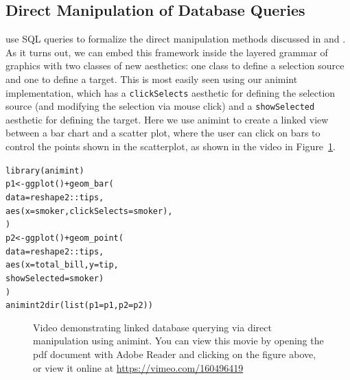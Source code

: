 \documentclass[journal]{vgtc}\usepackage[]{graphicx}\usepackage[]{color}
\makeatletter
\newcommand{\hlopt}[1]{\textcolor[rgb]{0,0,0}{#1}}%
\newcommand{\hlstd}[1]{\textcolor[rgb]{0,0,0}{#1}}%
\newcommand{\hlkwb}[1]{\textcolor[rgb]{0,0,0}{#1}}%
\newcommand{\hlkwc}[1]{\textcolor[rgb]{0,0,1}{#1}}%
\newcommand{\hlkwd}[1]{\textcolor[rgb]{0,0,0}{#1}}%
\newenvironment{kframe}{%
 \def\at@end@of@kframe{}%
 \ifinner\ifhmode%
  \def\at@end@of@kframe{\end{minipage}}%
  \begin{minipage}{\columnwidth}%
 \fi\fi%
 \def\FrameCommand##1{\hskip\@totalleftmargin \hskip-\fboxsep
 \colorbox{shadecolor}{##1}\hskip-\fboxsep
     \hskip-\linewidth \hskip-\@totalleftmargin \hskip\columnwidth}%
 \MakeFramed {\advance\hsize-\width
   \@totalleftmargin\z@ \linewidth\hsize
   \@setminipage}}%
 {\par\unskip\endMakeFramed%
 \at@end@of@kframe}
\newenvironment{knitrout}{}{} %
\makeatother
\begin{document}
\subsection{Direct Manipulation of Database Queries}

\citet{ggobi:2007} use SQL queries to formalize the direct manipulation methods discussed in \citet{Ahlberg:1991} and \citet{Buja:1991vh}. As it turns out, we can embed this framework inside the layered grammar of graphics with two classes of new aesthetics: one class to define a selection source and one to define a target. This is most easily seen using our animint implementation, which has a \texttt{clickSelects} aesthetic for defining the selection source (and modifying the selection via mouse click) and a \texttt{showSelected} aesthetic for defining the target. Here we use animint to create a linked view between a bar chart and a scatter plot, where the user can click on bars to control the points shown in the scatterplot, as shown in the video in Figure~\ref{fig:tips}.

\begin{knitrout}
\color{fgcolor}\begin{kframe}
\begin{alltt}
\hlkwd{library}\hlstd{(animint)}
\hlstd{p1} \hlkwb{<-} \hlkwd{ggplot}\hlstd{()} \hlopt{+} \hlkwd{geom_bar}\hlstd{(}
  \hlkwc{data} \hlstd{= reshape2}\hlopt{::}\hlstd{tips,}
  \hlkwd{aes}\hlstd{(}\hlkwc{x} \hlstd{= smoker,} \hlkwc{clickSelects} \hlstd{= smoker),}
\hlstd{)}
\hlstd{p2} \hlkwb{<-} \hlkwd{ggplot}\hlstd{()} \hlopt{+} \hlkwd{geom_point}\hlstd{(}
  \hlkwc{data} \hlstd{= reshape2}\hlopt{::}\hlstd{tips,}
  \hlkwd{aes}\hlstd{(}\hlkwc{x} \hlstd{= total_bill,} \hlkwc{y} \hlstd{= tip,}
      \hlkwc{showSelected} \hlstd{= smoker)}
\hlstd{)}
\hlkwd{animint2dir}\hlstd{(}\hlkwd{list}\hlstd{(}\hlkwc{p1} \hlstd{= p1,} \hlkwc{p2} \hlstd{= p2))}
\end{alltt}
\end{kframe}
\end{knitrout}

\begin{figure}[htp]
	\centerline{}
	\label{fig:tips}
	\caption{Video demonstrating linked database querying via direct manipulation using animint. You can view this movie by opening the pdf document with Adobe Reader and clicking on the figure above, or view it online at \url{https://vimeo.com/160496419}}
\end{figure}
\end{document}
